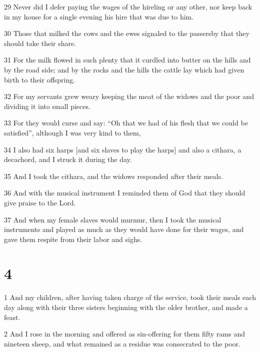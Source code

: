 \par 29 Never did I defer paying the wages of the hireling or any other, nor keep back in my house for a single evening his hire that was due to him.

\par 30 Those that milked the cows and the ewes signaled to the passersby that they should take their share.

\par 31 For the milk flowed in such plenty that it curdled into butter on the hills and by the road side; and by the rocks and the hills the cattle lay which had given birth to their offspring.

\par 32 For my servants grew weary keeping the meat of the widows and the poor and dividing it into small pieces.

\par 33 For they would curse and say: “Oh that we had of his flesh that we could be satisfied”, although I was very kind to them,

\par 34 I also had six harps [and six slaves to play the harps] and also a cithara, a decachord, and I struck it during the day.

\par 35 And I took the cithara, and the widows responded after their meals.

\par 36 And with the musical instrument I reminded them of God that they should give praise to the Lord.

\par 37 And when my female slaves would murmur, then I took the musical instruments and played as much as they would have done for their wages, and gave them respite from their labor and sighs.

\chapter{4}

\par 1 And my children, after having taken charge of the service, took their meals each day along with their three sisters beginning with the older brother, and made a feast.

\par 2 And I rose in the morning and offered as sin-offering for them fifty rams and nineteen sheep, and what remained as a residue was consecrated to the poor.


